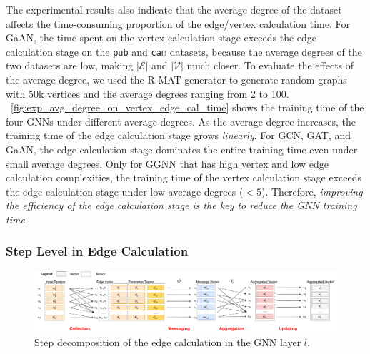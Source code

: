 The experimental results also indicate that the average degree of the dataset affects the time-consuming proportion of the edge/vertex calculation time.
For GaAN, the time spent on the vertex calculation stage exceeds the edge calculation stage on the \texttt{pub} and \texttt{cam} datasets, because the average degrees of the two datasets are low, making $|\mathcal{E}|$ and $|\mathcal{V}|$ much closer.
To evaluate the effects of the average degree, we used the R-MAT generator to generate random graphs with 50k vertices and the average degrees ranging from 2 to 100.
\figurename~\ref{fig:exp_avg_degree_on_vertex_edge_cal_time} shows the training time of the four GNNs under different average degrees.
As the average degree increases, the training time of the edge calculation stage grows \emph{linearly}.
For GCN, GAT, and GaAN, the edge calculation stage dominates the entire training time even under small average degrees.
Only for GGNN that has high vertex and low edge calculation complexities, the training time of the vertex calculation stage exceeds the edge calculation stage under low average degrees ($<5$).
Therefore, \emph{improving the efficiency of the edge calculation stage is the key to reduce the GNN training time}.

\subsubsection{Step Level in Edge Calculation}

\begin{figure}[tbp]
    \centering
    \includegraphics[width=1\columnwidth]{figs/illustration/steps_in_edge_calculation.pdf}
    \caption{Step decomposition of the edge calculation in the GNN layer $l$.}
    \label{fig:steps_in_edge_calculation}
\end{figure}

